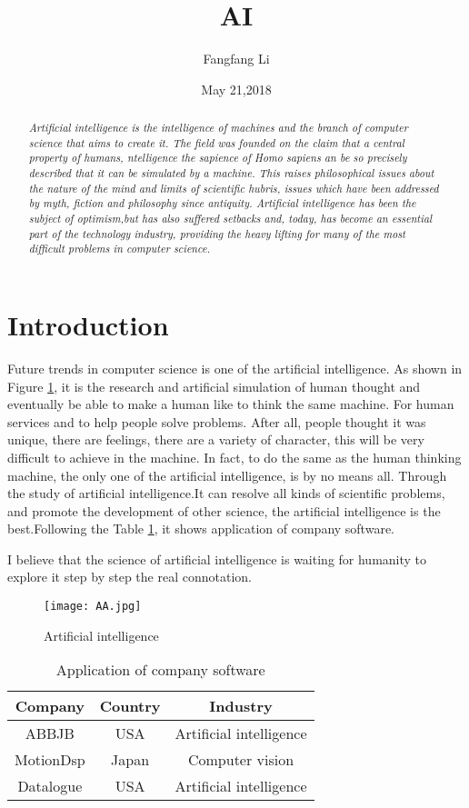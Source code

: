 \documentclass{article}
\title{AI}
\author{Fangfang Li}
\date{May 21,2018}
\begin{document}
\twocolumn
\maketitle

\begin{abstract}

 \emph{Artificial intelligence is the intelligence of machines and the branch of computer science that aims to create it. The field was founded on the claim that a central property of humans, ntelligence the sapience of Homo sapiens an be so precisely described that it can be simulated by a machine. This raises philosophical issues about the nature of the mind and limits of scientific hubris, issues which have been addressed by myth, fiction and philosophy since antiquity. Artificial intelligence has been the subject of optimism,but has also suffered setbacks and, today, has become an essential part of the technology industry, providing the heavy lifting for many of the most difficult problems in computer science.}
\end{abstract}
\section{Introduction}
Future trends in computer science is one of the artificial intelligence\cite{Yong2017}. As shown in Figure \ref{1}, it is the research and artificial simulation of human thought and eventually be able to make a human like to think the same machine. For human services and to help people solve problems. After all, people thought it was unique, there are feelings, there are a variety of character, this will be very difficult to achieve in the machine. In fact, to do the same as the human thinking machine,  the only one of the artificial intelligence, is by no means all. Through the study of artificial intelligence\cite{Goossens2000}.It can resolve all kinds of scientific problems, and promote the development of other science, the artificial intelligence is the best.Following the Table \ref{table1}, it shows application of company software.
\par I believe that the science of artificial intelligence is waiting for humanity to explore it step by step the real connotation.



\begin{figure}[!htb]
\centering
\texttt{[image: AA.jpg]}
\caption{ Artificial intelligence}
\label{1}
\end{figure}

\begin{table}[!htb]
\caption{Application of company software}
\label{table1}
\begin{tabular}{ccc}
\hline
Company 	&Country	                   &Industry\\
\hline
ABBJB        &USA                              &Artificial intelligence \\
MotionDsp    &Japan                            &Computer vision \\
Datalogue    &USA                              &Artificial intelligence \\
\hline
\end{tabular}
\end{table}

\end{document}
